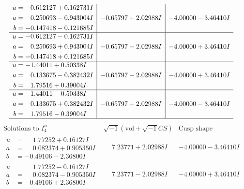 \documentclass[1p]{elsarticle_modified}
\theoremstyle{definition}
\newcommand{\I}{\sqrt{-1}}
\begin{document}
$$\begin{array}{c|c|c}
\begin{aligned}
u &= -0.612127 + 0.162731 I \\
a &= \phantom{-}0.250693 - 0.943004 I \\
b &= -0.147418 - 0.121685 I\end{aligned}
 & -0.65797 + 2.02988 I & -4.00000 - 3.46410 I \\ \hline\begin{aligned}
u &= -0.612127 - 0.162731 I \\
a &= \phantom{-}0.250693 + 0.943004 I \\
b &= -0.147418 + 0.121685 I\end{aligned}
 & -0.65797 - 2.02988 I & -4.00000 + 3.46410 I \\ \hline\begin{aligned}
u &= -1.44011 + 0.50338 I \\
a &= \phantom{-}0.133675 - 0.382432 I \\
b &= \phantom{-}1.79516 + 0.39004 I\end{aligned}
 & -0.65797 - 2.02988 I & -4.00000 + 3.46410 I \\ \hline\begin{aligned}
u &= -1.44011 - 0.50338 I \\
a &= \phantom{-}0.133675 + 0.382432 I \\
b &= \phantom{-}1.79516 - 0.39004 I\end{aligned}
 & -0.65797 + 2.02988 I & -4.00000 - 3.46410 I\\
 \hline 
 \end{array}$$\newpage$$\begin{array}{c|c|c}  
\text{Solutions to }I^u_{4}& \I (\text{vol} + \sqrt{-1}CS) & \text{Cusp shape}\\
 \hline 
\begin{aligned}
u &= \phantom{-}1.77252 + 0.16127 I \\
a &= \phantom{-}0.082374 + 0.905350 I \\
b &= -0.49106 - 2.36800 I\end{aligned}
 & \phantom{-}7.23771 + 2.02988 I & -4.00000 - 3.46410 I \\ \hline\begin{aligned}
u &= \phantom{-}1.77252 - 0.16127 I \\
a &= \phantom{-}0.082374 - 0.905350 I \\
b &= -0.49106 + 2.36800 I\end{aligned}
 & \phantom{-}7.23771 - 2.02988 I & -4.00000 + 3.46410 I \\ \hline\begin{aligned}

\end{aligned}
\end{array}$$
\end{document}
